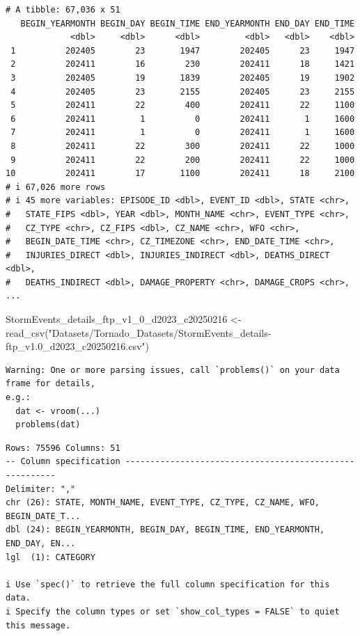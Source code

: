 \documentclass[
  letterpaper,
  DIV=11,
  numbers=noendperiod]{scrreprt}
\newenvironment{Shaded}{\begin{snugshade}}{\end{snugshade}}
\newcommand{\FunctionTok}[1]{\textcolor[rgb]{0.28,0.35,0.67}{#1}}
\newcommand{\NormalTok}[1]{\textcolor[rgb]{0.00,0.23,0.31}{#1}}
\newcommand{\OtherTok}[1]{\textcolor[rgb]{0.00,0.23,0.31}{#1}}
\newcommand{\StringTok}[1]{\textcolor[rgb]{0.13,0.47,0.30}{#1}}
\begin{document}
\begin{verbatim}
# A tibble: 67,036 x 51
   BEGIN_YEARMONTH BEGIN_DAY BEGIN_TIME END_YEARMONTH END_DAY END_TIME
             <dbl>     <dbl>      <dbl>         <dbl>   <dbl>    <dbl>
 1          202405        23       1947        202405      23     1947
 2          202411        16        230        202411      18     1421
 3          202405        19       1839        202405      19     1902
 4          202405        23       2155        202405      23     2155
 5          202411        22        400        202411      22     1100
 6          202411         1          0        202411       1     1600
 7          202411         1          0        202411       1     1600
 8          202411        22        300        202411      22     1000
 9          202411        22        200        202411      22     1000
10          202411        17       1100        202411      18     2100
# i 67,026 more rows
# i 45 more variables: EPISODE_ID <dbl>, EVENT_ID <dbl>, STATE <chr>,
#   STATE_FIPS <dbl>, YEAR <dbl>, MONTH_NAME <chr>, EVENT_TYPE <chr>,
#   CZ_TYPE <chr>, CZ_FIPS <dbl>, CZ_NAME <chr>, WFO <chr>,
#   BEGIN_DATE_TIME <chr>, CZ_TIMEZONE <chr>, END_DATE_TIME <chr>,
#   INJURIES_DIRECT <dbl>, INJURIES_INDIRECT <dbl>, DEATHS_DIRECT <dbl>,
#   DEATHS_INDIRECT <dbl>, DAMAGE_PROPERTY <chr>, DAMAGE_CROPS <chr>, ...
\end{verbatim}

\begin{Shaded}
\begin{Highlighting}[]
\NormalTok{StormEvents\_details\_ftp\_v1\_0\_d2023\_c20250216 }\OtherTok{\textless{}{-}} \FunctionTok{read\_csv}\NormalTok{(}\StringTok{"Datasets/Tornado\_Datasets/StormEvents\_details{-}ftp\_v1.0\_d2023\_c20250216.csv"}\NormalTok{)}
\end{Highlighting}
\end{Shaded}

\begin{verbatim}
Warning: One or more parsing issues, call `problems()` on your data frame for details,
e.g.:
  dat <- vroom(...)
  problems(dat)
\end{verbatim}

\begin{verbatim}
Rows: 75596 Columns: 51
-- Column specification --------------------------------------------------------
Delimiter: ","
chr (26): STATE, MONTH_NAME, EVENT_TYPE, CZ_TYPE, CZ_NAME, WFO, BEGIN_DATE_T...
dbl (24): BEGIN_YEARMONTH, BEGIN_DAY, BEGIN_TIME, END_YEARMONTH, END_DAY, EN...
lgl  (1): CATEGORY

i Use `spec()` to retrieve the full column specification for this data.
i Specify the column types or set `show_col_types = FALSE` to quiet this message.
\end{verbatim}
\end{document}
